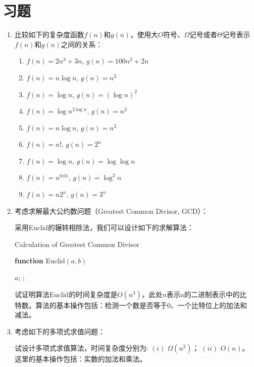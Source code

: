 \section*{习题}	
\begin{enumerate}[1.]
	\item 比较如下的复杂度函数$f(n)$和$g(n)$，使用大$O$符号、$\Omega$记号或者$\Theta$记号表示$f(n)$和$g(n)$之间的关系：
	\begin{enumerate}[(1)]
		\item $f(n) = 2n^ 3 + 3 n $, $g(n) = 100 n^2 + 2n$ 
		\item $f(n) = n \log n  $, $g(n) = n^2 $ 
		\item $f(n) =  \log n  $, $g(n) = (\log n)^2 $ 
		\item $f(n) =  \log n ^{2 \log n }  $, $g(n) = n^2 $ 
		\item $f(n) = n \log n  $, $g(n) = n^2 $ 
		\item $f(n) = n!  $, $g(n) = 2^n $ 
		\item $f(n) = \log n   $, $g(n) =  \log\log n  $ 
		\item $f(n) = n^{0.01}  $, $g(n) =  \log^2 n $ 
		\item $f(n) = n 2^n  $, $g(n) = 3^n $ 
	\end{enumerate}	
	
	\item 考虑求解最大公约数问题（Greatest Common Divisor, GCD）：
\begin{center}
\end{center}
	采用Euclid的辗转相除法，我们可以设计如下的求解算法：	
\begin{algorithm}[H]
\caption{Calculation of Greatest Common Divisor}\label{GCD}
{\bf function} {\sc Euclid}$(a,b)$
\begin{algorithmic}[1]
	\RETURN $a$; 
\ENDIF
{}; 
\end{algorithmic}
\end{algorithm}
	试证明算法{\sc Euclid}的时间复杂度是$O(n^3)$，此处$n$表示$a$的二进制表示中的比特数。算法的基本操作包括：检测一个数是否等于$0$、一个比特位上的加法和减法。

	\item 考虑如下的多项式求值问题：
\begin{center}
\end{center}
	试设计多项式求值算法，时间复杂度分别为: $(i)$ $\Omega(n^2)$； $(ii)$ $O(n)$。这里的基本操作包括：实数的加法和乘法。

\end{enumerate}	
		
